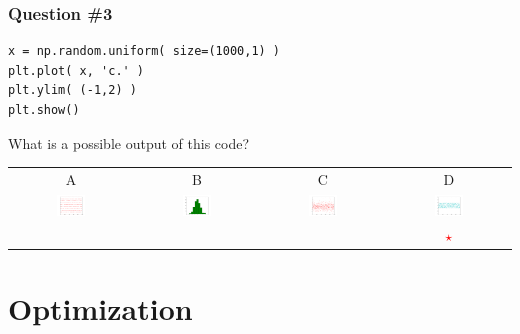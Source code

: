 \documentclass[11pt]{beamer}
\newcommand{\correctstar}{\textcolor{red}{$\star$}}
\begin{document}
\begin{frame}[fragile]
  \frametitle{Question \#3}
  \Enlarge

  \begin{Verbatim}
x = np.random.uniform( size=(1000,1) )
plt.plot( x, 'c.' )
plt.ylim( (-1,2) )
plt.show()
  \end{Verbatim}

  What is a possible output of this code?

  \begin{center}
  \begin{tabular}{cccc}
    A & B & C & D \\
    \includegraphics[width=0.25\textwidth]{./img/figure_2.png}
    &
    \includegraphics[width=0.25\textwidth]{./img/figure_3.png}
    &
    \includegraphics[width=0.25\textwidth]{./img/figure_4.png}
    &
    \includegraphics[width=0.25\textwidth]{./img/figure_5.png}
    \\
    & & & \correctstar \\
  \end{tabular}
  \end{center}
\end{frame}

\section{Optimization}
\end{document}
